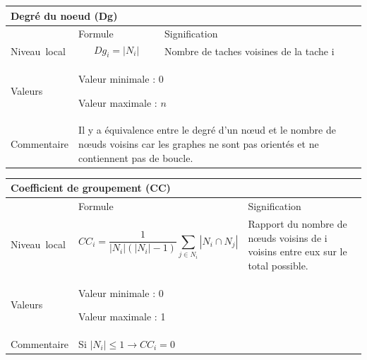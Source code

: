 \documentclass{article}
\begin{document}
\begin{table}[H]
\raggedright
\begin{tabular}{|m{3.24cm}|m{4.4810004cm}m{7.924cm}|}

\hline
\multicolumn{3}{|m{16.044998cm}|}{Degré du noeud (Dg)}\\\hline
 &
\multicolumn{1}{m{4.4810004cm}|}{Formule} &
Signification\\\hline
Niveau~local 

 &
\multicolumn{1}{m{4.4810004cm}|}{\begin{equation*}
{\mathit{Dg}}_{i}=\left|{N}_{i}\right|
\end{equation*}
} &
Nombre de taches voisines de la tache i\\\hline
Valeurs &
\multicolumn{2}{m{12.6050005cm}|}{Valeur minimale : 0

Valeur maximale :  $n$

}\\\hline
Commentaire &
\multicolumn{2}{m{12.6050005cm}|}{Il y a équivalence entre le degré d’un nœud et le nombre de nœuds voisins car les graphes ne sont pas orientés et ne contiennent pas de boucle.

}\\\hline
\end{tabular}
\end{table}
\begin{table}[H]
\raggedright
\begin{tabular}{|m{3.24cm}|m{5.303cm}m{7.103cm}|}

\hline
\multicolumn{3}{|m{16.046cm}|}{Coefficient de groupement (CC)}\\\hline
 &
\multicolumn{1}{m{5.303cm}|}{Formule} &
Signification\\\hline
Niveau~local 

 &
\multicolumn{1}{m{5.303cm}|}{\begin{equation*}
{\mathit{CC}}_{i}=\frac{1}{\left|{N}_{i}\right|\left(\left|{N}_{i}\right|-1\right)}\sum _{j{\in}{N}_{i}}{\left|{N}_{i}{\cap}{N}_{j}\right|}
\end{equation*}
} &
Rapport du nombre de nœuds voisins de i voisins entre eux sur le total possible.\\\hline
Valeurs &
\multicolumn{2}{m{12.606cm}|}{Valeur minimale : 0

Valeur maximale : 1}\\\hline
Commentaire &
\multicolumn{2}{m{12.606cm}|}{Si  $\left|{N}_{i}\right|{\leq}1\rightarrow {\mathit{CC}}_{i}=0$ }\\\hline
\end{tabular}
\end{table}
\end{document}
